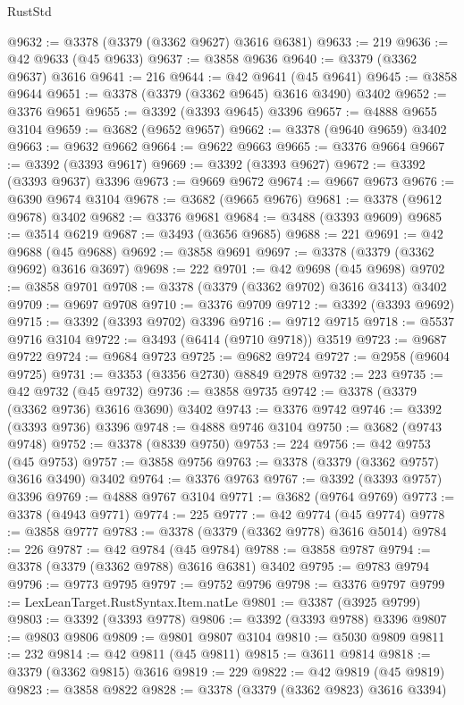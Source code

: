 \begin{lexlean}{RustStd}
\begin{coremodule}
@9632 := @3378 (@3379 (@3362 @9627) @3616 @6381)
@9633 := 219
@9636 := @42 @9633 (@45 @9633)
@9637 := @3858 @9636
@9640 := @3379 (@3362 @9637) @3616
@9641 := 216
@9644 := @42 @9641 (@45 @9641)
@9645 := @3858 @9644
@9651 := @3378 (@3379 (@3362 @9645) @3616 @3490) @3402
@9652 := @3376 @9651
@9655 := @3392 (@3393 @9645) @3396
@9657 := @4888 @9655 @3104
@9659 := @3682 (@9652 @9657)
@9662 := @3378 (@9640 @9659) @3402
@9663 := @9632 @9662
@9664 := @9622 @9663
@9665 := @3376 @9664
@9667 := @3392 (@3393 @9617)
@9669 := @3392 (@3393 @9627)
@9672 := @3392 (@3393 @9637) @3396
@9673 := @9669 @9672
@9674 := @9667 @9673
@9676 := @6390 @9674 @3104
@9678 := @3682 (@9665 @9676)
@9681 := @3378 (@9612 @9678) @3402
@9682 := @3376 @9681
@9684 := @3488 (@3393 @9609)
@9685 := @3514 @6219
@9687 := @3493 (@3656 @9685)
@9688 := 221
@9691 := @42 @9688 (@45 @9688)
@9692 := @3858 @9691
@9697 := @3378 (@3379 (@3362 @9692) @3616 @3697)
@9698 := 222
@9701 := @42 @9698 (@45 @9698)
@9702 := @3858 @9701
@9708 := @3378 (@3379 (@3362 @9702) @3616 @3413) @3402
@9709 := @9697 @9708
@9710 := @3376 @9709
@9712 := @3392 (@3393 @9692)
@9715 := @3392 (@3393 @9702) @3396
@9716 := @9712 @9715
@9718 := @5537 @9716 @3104
@9722 := @3493 (@6414 (@9710 @9718)) @3519
@9723 := @9687 @9722
@9724 := @9684 @9723
@9725 := @9682 @9724
@9727 := @2958 (@9604 @9725)
@9731 := @3353 (@3356 @2730) @8849 @2978
@9732 := 223
@9735 := @42 @9732 (@45 @9732)
@9736 := @3858 @9735
@9742 := @3378 (@3379 (@3362 @9736) @3616 @3690) @3402
@9743 := @3376 @9742
@9746 := @3392 (@3393 @9736) @3396
@9748 := @4888 @9746 @3104
@9750 := @3682 (@9743 @9748)
@9752 := @3378 (@8339 @9750)
@9753 := 224
@9756 := @42 @9753 (@45 @9753)
@9757 := @3858 @9756
@9763 := @3378 (@3379 (@3362 @9757) @3616 @3490) @3402
@9764 := @3376 @9763
@9767 := @3392 (@3393 @9757) @3396
@9769 := @4888 @9767 @3104
@9771 := @3682 (@9764 @9769)
@9773 := @3378 (@4943 @9771)
@9774 := 225
@9777 := @42 @9774 (@45 @9774)
@9778 := @3858 @9777
@9783 := @3378 (@3379 (@3362 @9778) @3616 @5014)
@9784 := 226
@9787 := @42 @9784 (@45 @9784)
@9788 := @3858 @9787
@9794 := @3378 (@3379 (@3362 @9788) @3616 @6381) @3402
@9795 := @9783 @9794
@9796 := @9773 @9795
@9797 := @9752 @9796
@9798 := @3376 @9797
@9799 := LexLeanTarget.RustSyntax.Item.natLe
@9801 := @3387 (@3925 @9799)
@9803 := @3392 (@3393 @9778)
@9806 := @3392 (@3393 @9788) @3396
@9807 := @9803 @9806
@9809 := @9801 @9807 @3104
@9810 := @5030 @9809
@9811 := 232
@9814 := @42 @9811 (@45 @9811)
@9815 := @3611 @9814
@9818 := @3379 (@3362 @9815) @3616
@9819 := 229
@9822 := @42 @9819 (@45 @9819)
@9823 := @3858 @9822
@9828 := @3378 (@3379 (@3362 @9823) @3616 @3394)

\end{coremodule}
\end{lexlean}
